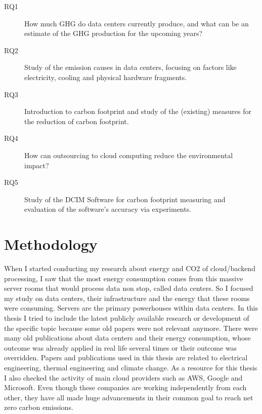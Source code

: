 \documentclass[
  a4paper,  %
  twoside,  %
  bibliography=totoc,
  headsepline,
  cleardoublepage=empty,
  parskip=half,
  draft=false
]{scrbook}
\begin{document}
\begin{description}
	\item[RQ1] How much GHG do data centers currently produce, and what can be an estimate of the GHG production for the upcoming years?
	\item[RQ2] Study of the emission causes in data centers, focusing on factors like electricity, cooling and physical hardware fragments.
	\item[RQ3] Introduction to carbon footprint and study of the (existing) measures for the reduction of carbon footprint. 
	\item[RQ4] How can outsourcing to cloud computing reduce the environmental impact?
	\item[RQ5] Study of the DCIM Software for carbon footprint measuring and evaluation of the software's accuracy via experiments.
\end{description}

\section{Methodology}



When I started conducting my research about energy and CO2 of cloud/backend processing, I saw that the most energy consumption comes from this massive server rooms that would process data non stop, called data centers. So I focused my study on data centers, their infrastructure and the energy that these rooms were consuming. Servers are the primary powerhouses within data centers.
In this thesis I tried to include the latest publicly available research or development of the specific topic because some old papers were not relevant anymore. There were many old publications about data centers and their energy consumption, whose outcome was already applied in real life several times or their outcome was overridden. Papers and publications used in this thesis are related to electrical engineering, thermal engineering and climate change. As a resource for this thesis I also checked the activity of main cloud providers such as AWS, Google and Microsoft. Even though these companies are working independently from each other, they have all made huge advancements in their common goal to reach net zero carbon emissions.
\end{document}
